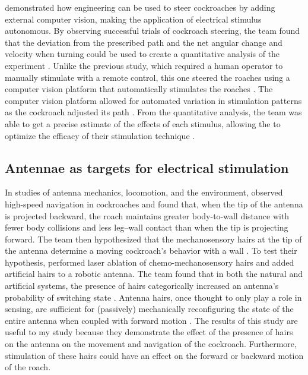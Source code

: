 \citet{whitmire2013kinect} demonstrated how engineering can be used to steer cockroaches by adding external computer vision, making the application of electrical stimulus autonomous. By observing successful trials of cockroach steering, the team found that the deviation from the prescribed path and the net angular change and velocity when turning could be used to create a quantitative analysis of the experiment \citep{whitmire2013kinect}. Unlike the previous study, which required a human operator to manually stimulate with a remote control, this one steered the roaches using a computer vision platform that automatically stimulates the roaches \citep{whitmire2013kinect}. The computer vision platform allowed for automated variation in stimulation patterns as the cockroach adjusted its path \citep{whitmire2013kinect}. From the quantitative analysis, the team was able to get a precise estimate of the effects of each stimulus, allowing the to optimize the efficacy of their stimulation technique \citep{whitmire2013kinect}. 





\subsection{Antennae as targets for electrical stimulation}
In studies of antenna mechanics, locomotion, and the environment, \citet{Mongeau2014} observed high-speed navigation in cockroaches and found that, when the tip of the antenna is projected backward, the roach maintains greater body-to-wall distance with fewer body collisions and less leg–wall contact than when the tip is projecting forward. The team then hypothesized that the mechanosensory hairs at the tip of the antenna determine a moving cockroach's behavior with a wall \citep{Mongeau2014}. To test their hypothesis, \citet{Mongeau2014} performed laser ablation of chemo-mechanosensory hairs and added artificial hairs to a robotic antenna. The team found that in both the natural and artificial systems, the presence of hairs categorically increased an antenna’s probability of switching state \citep{Mongeau2014}. Antenna hairs, once thought to only play a role in sensing, are sufficient for (passively) mechanically reconfiguring the state of the entire antenna when coupled with forward motion \citep{Mongeau2014}. The results of this study are useful to my study because they demonstrate the effect of the presence of hairs on the antenna on the movement and navigation of the cockroach. Furthermore, stimulation of these hairs could have an effect on the forward or backward motion of the roach.

